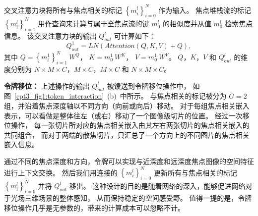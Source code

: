 %
%
%
%
交叉注意力块将所有与焦点相关的标记 $ \left \{ m_{i}^{l} \right \}_{i=0}^{N} $ 作为输入。 焦点堆栈流的标记 $ \left \{  m_{i}^{l} \right \}_{i=1}^{N} $ 用作查询来计算与属于全焦点流的键 $ m_{0}^{l} $ 的相似度并从值 $ m_{0}^{l} $ 检索焦点信息。 该交叉注意力块的输出 $ Q_{out}^{l} $ 可计算如下：
%
%
\begin{equation}
	Q_{out}^{1} = LN \left ( Attention(Q,K,V) + Q \right ),
\end{equation}
%
%
其中
$ Q = \left \{ m_{i}^{1} \right \}_{i=1}^{N}~ W^{Q}$，
$ K= m_{0}^{1} ~W^{K} $，
$ V =  m_{0}^{1}~ W^{V} $。
$ Q$，$K$，$V$ 和 $ Q_{out}^{l} $
的维度分别为 
$ N \times M \times C $，$ M \times C $，$ M \times C $ 
和
 $ N \times M \times C $。 
%
%
%
\par
%
%
%
\textbf{令牌移位：}
%
%
上述操作的输出 $ Q_{out}^{l} $ 被馈送到令牌移位操作中，
如图~\ref{cpt3_fig1:token_interaction}~(b)~中所示。 
与焦点相关的标记被分为 $G = 2$ 组，并沿着焦点深度轴以不同方向（向前或向后）移动。 
对于每组焦点相关嵌入表示，可以看做是整体往左（或右）移动了一个图像级切片的位置。
经过一次移位操作，
每一张切片所对应的焦点相关嵌入由其左右两张切片的焦点相关嵌入的共同组合，
而对于两端的散焦切片，只汇总了一个方向上的不同图片的焦点相关嵌入信息。
%
%
%
%
%
\par
%
%
通过不同的焦点深度和方向，令牌可以实现与近深度和远深度焦点图像的空间特征进行上下文交换。 
然后我们用连接的 $ \left \{ m_{i}^{l} \right \}_{i=0}^{N} $ 更新所有与焦点相关的标记  $ \left \{ m_{i}^{l} \right \}_{i=0}^{N} $ 并将 
$ Q_{out}^{l} $ 移出。 
%
%
%
%
%
%
这种设计的目的是随着网络的深入，能够促进网络对于光场三维场景的整体感知，
从而保持稳定的空间感受野。 
值得一提的是，令牌移位操作几乎是无参数的，带来的计算成本可以忽略不计。







